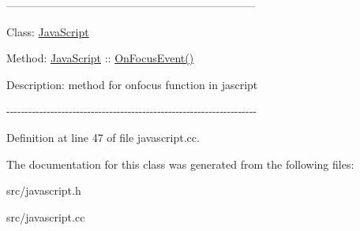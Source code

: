 --------------------------------------------------------------------\par
 Class\-: \hyperlink{classJavaScript}{Java\-Script} \par
 Method\-: \hyperlink{classJavaScript}{Java\-Script} \-:\-: \hyperlink{classJavaScript_a00f423ed216ac8558efc63d450e76b0e}{On\-Focus\-Event()} \par
 Description\-: method for onfocus function in jascript \par
 -\/-\/-\/-\/-\/-\/-\/-\/-\/-\/-\/-\/-\/-\/-\/-\/-\/-\/-\/-\/-\/-\/-\/-\/-\/-\/-\/-\/-\/-\/-\/-\/-\/-\/-\/-\/-\/-\/-\/-\/-\/-\/-\/-\/-\/-\/-\/-\/-\/-\/-\/-\/-\/-\/-\/-\/-\/-\/-\/-\/-\/-\/-\/-\/-\/-\/-\/-\/ 

Definition at line 47 of file javascript.\-cc.



The documentation for this class was generated from the following files\-:\begin{DoxyCompactItemize}
\item 
src/javascript.\-h\item 
src/javascript.\-cc\end{DoxyCompactItemize}
